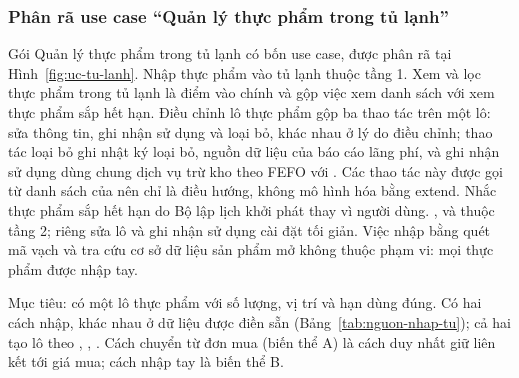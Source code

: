 \subsubsection{Phân rã use case “Quản lý thực phẩm trong tủ lạnh”}\label{sssec:pr-tu-lanh}

Gói Quản lý thực phẩm trong tủ lạnh có bốn use case, được phân rã tại Hình~\ref{fig:uc-tu-lanh}.  Nhập thực phẩm vào tủ lạnh thuộc tầng 1.  Xem và lọc thực phẩm trong tủ lạnh là điểm vào chính và gộp việc xem danh sách với xem thực phẩm sắp hết hạn.  Điều chỉnh lô thực phẩm gộp ba thao tác trên một lô: sửa thông tin, ghi nhận sử dụng và loại bỏ, khác nhau ở lý do điều chỉnh; thao tác loại bỏ ghi nhật ký loại bỏ, nguồn dữ liệu của báo cáo lãng phí, và ghi nhận sử dụng dùng chung dịch vụ trừ kho theo FEFO với . Các thao tác này được gọi từ danh sách của  nên chỉ là điều hướng, không mô hình hóa bằng extend.  Nhắc thực phẩm sắp hết hạn do Bộ lập lịch khởi phát thay vì người dùng. ,  và  thuộc tầng 2; riêng sửa lô và ghi nhận sử dụng cài đặt tối giản. Việc nhập bằng quét mã vạch và tra cứu cơ sở dữ liệu sản phẩm mở không thuộc phạm vi: mọi thực phẩm được nhập tay.



Mục tiêu: có một lô thực phẩm với số lượng, vị trí và hạn dùng đúng. Có hai cách nhập, khác nhau ở dữ liệu được điền sẵn (Bảng~\ref{tab:nguon-nhap-tu}); cả hai tạo lô theo , , . Cách chuyển từ đơn mua (biến thể A) là cách duy nhất giữ liên kết tới giá mua; cách nhập tay là biến thể B.

